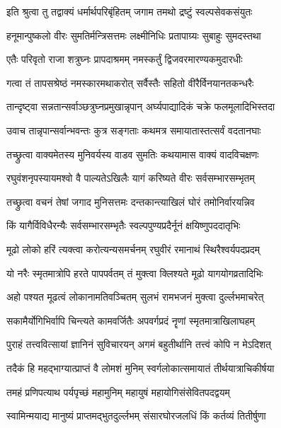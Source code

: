 \twolineshloka
{इति श्रुत्वा तु तद्वाक्यं धर्मार्थपरिबृंहितम्}
{जगाम तमथो द्रष्टुं स्वल्पसेवकसंयुतः}%

\twolineshloka
{हनूमान्पुष्कलो वीरः सुमतिर्मन्त्रिसत्तमः}
{लक्ष्मीनिधिः प्रतापाग्र्यः सुबाहुः सुमदस्तथा}%

\twolineshloka
{एतैः परिवृतो राजा शत्रुघ्नः प्रापदाश्रमम्}
{नमस्कर्तुं द्विजवरमारण्यकमुदारधीः}%

\twolineshloka
{गत्वा तं तापसश्रेष्ठं नमस्कारमथाकरोत्}
{सर्वैस्तैः सहितो वीरैर्विनयानतकन्धरैः}%

\twolineshloka
{तान्दृष्ट्वा सन्नतान्सर्वाञ्छत्रुघ्नप्रमुखान्नृपान्}
{अर्घ्यपाद्यादिकं चक्रे फलमूलादिभिस्तदा}%

\twolineshloka
{उवाच तान्नृपान्सर्वान्भवन्तः कुत्र सङ्गताः}
{कथमत्र समायातास्तत्सर्वं वदतानघाः}%

\twolineshloka
{तच्छ्रुत्वा वाक्यमेतस्य मुनिवर्यस्य वाडव}
{सुमतिः कथयामास वाक्यं वादविचक्षणः}%


\twolineshloka
{रघुवंशनृपस्यायमश्वो वै पाल्यतेऽखिलैः}
{यागं करिष्यते वीरः सर्वसम्भारसम्भृतम्}%

\twolineshloka
{तच्छ्रुत्वा वचनं तेषां जगाद मुनिसत्तमः}
{दन्तकान्त्याखिलं घोरं तमोनिर्वारयन्निव}%


\twolineshloka
{किं यागैर्विविधैरन्यैः सर्वसम्भारसम्भृतैः}
{स्वल्पपुण्यप्रदैर्नूनं क्षयिष्णुपददातृभिः}%

\twolineshloka
{मूढो लोको हरिं त्यक्त्वा करोत्यन्यसमर्चनम्}
{रघुवीरं रमानाथं स्थिरैश्वर्यपदप्रदम्}%

\twolineshloka
{यो नरैः स्मृतमात्रोपि हरते पापपर्वतम्}
{तं मुक्त्वा क्लिश्यते मूढो यागयोगव्रतादिभिः}%

\twolineshloka
{अहो पश्यत मूढत्वं लोकानामतिवञ्चितम्}
{सुलभं रामभजनं मुक्त्वा दुर्ल्लभमाचरेत्}%

\twolineshloka
{सकामैर्योगिभिर्वापि चिन्त्यते कामवर्जितैः}
{अपवर्गप्रदं नॄणां स्मृतमात्राखिलाघहम्}%

\twolineshloka
{पुराहं तत्त्ववित्सायां ज्ञानिनं सुविचारयन्}
{अगमं बहुतीर्थानि तत्त्वं कोपि न मेऽदिशत्}%

\twolineshloka
{तदैकं हि महद्भाग्यात्प्राप्तं वै लोमशं मुनिम्}
{स्वर्गलोकात्समायातं तीर्थयात्राचिकीर्षया}%

\twolineshloka
{तमहं प्रणिपत्याथ पर्यपृच्छं महामुनिम्}
{महायुषं महायोगिसंसेवितपदद्वयम्}%

\twolineshloka
{स्वामिन्मयाद्य मानुष्यं प्राप्तमद्भुतदुर्ल्लभम्}
{संसारघोरजलधिं किं कर्तव्यं तितीर्षुणा}%


